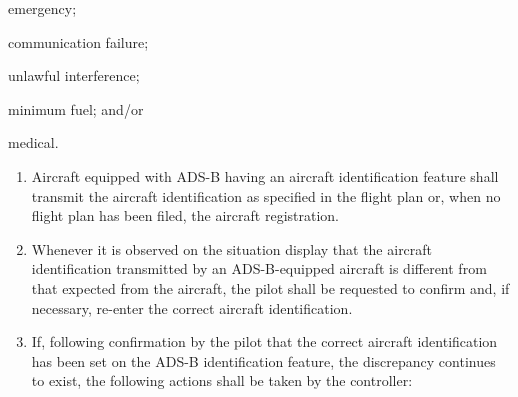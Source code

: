 \begin{noteev}
     \label{8.5.4N1}
    \begin{enumalph}
        \item emergency;
        \item communication failure;
        \item unlawful interference;
        \item minimum fuel; and/or
        \item medical.
    \end{enumalph}
\end{noteev}

\begin{enumerate}
    \item Aircraft equipped with ADS-B having an aircraft identification feature shall transmit the aircraft identification as specified in the flight plan or, when no flight plan has been filed, the aircraft registration.
    \item Whenever it is observed on the situation display that the aircraft identification transmitted by an ADS-B-equipped aircraft is different from that expected from the aircraft, the pilot shall be requested to confirm and, if necessary, re-enter the correct aircraft identification.
    \item If, following confirmation by the pilot that the correct aircraft identification has been set on the ADS-B identification feature, the discrepancy continues to exist, the following actions shall be taken by the controller:

\end{enumerate}

